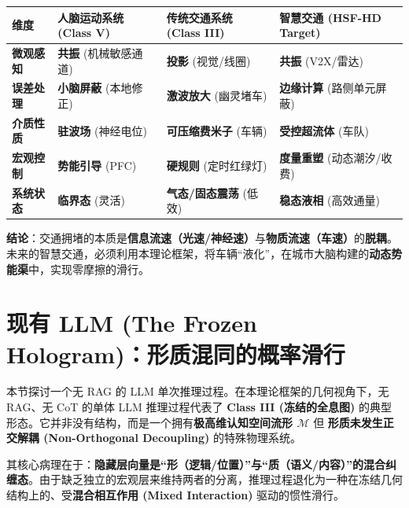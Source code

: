 
\begin{table}[htbp]
\centering
\begin{tabularx}{\textwidth}{l X X X}
\toprule
\rowcolor{structurecolor!20} 维度 & \textbf{人脑运动系统 (Class V)} & \textbf{传统交通系统 (Class III)} & \textbf{智慧交通 (HSF-HD Target)} \\
\midrule
\textbf{微观感知} & \textbf{共振} (机械敏感通道) & \textbf{投影} (视觉/线圈) & \textbf{共振} (V2X/雷达) \\
\textbf{误差处理} & \textbf{小脑屏蔽} (本地修正) & \textbf{激波放大} (幽灵堵车) & \textbf{边缘计算} (路侧单元屏蔽) \\
\textbf{介质性质} & \textbf{驻波场} (神经电位) & \textbf{可压缩费米子} (车辆) & \textbf{受控超流体} (车队) \\
\textbf{宏观控制} & \textbf{势能引导} (PFC) & \textbf{硬规则} (定时红绿灯) & \textbf{度量重塑} (动态潮汐/收费) \\
\textbf{系统状态} & \textbf{临界态} (灵活) & \textbf{气态/固态震荡} (低效) & \textbf{稳态液相} (高效通量) \\
\bottomrule
\end{tabularx}
\end{table}

\textbf{结论}：交通拥堵的本质是\textbf{信息流速（光速/神经速）}与\textbf{物质流速（车速）}的\textbf{脱耦}。未来的智慧交通，必须利用本理论框架，将车辆“液化”，在城市大脑构建的\textbf{动态势能渠}中，实现零摩擦的滑行。

\section{现有 LLM (The Frozen Hologram)：形质混同的概率滑行}
\label{sec:section_4389}

本节探讨一个无 RAG 的 LLM 单次推理过程。在本理论框架的几何视角下，无 RAG、无 CoT 的单体 LLM 推理过程代表了 \textbf{Class III (冻结的全息图)} 的典型形态。它并非没有结构，而是一个拥有\textbf{极高维认知空间流形 $\mathcal{M}$} 但 \textbf{形质未发生正交解耦 (Non-Orthogonal Decoupling)} 的特殊物理系统。

其核心病理在于：\textbf{隐藏层向量是“形（逻辑/位置）”与“质（语义/内容）”的混合纠缠态}。由于缺乏独立的宏观层来维持两者的分离，推理过程退化为一种在冻结几何结构上的、受\textbf{混合相互作用 (Mixed Interaction)} 驱动的惯性滑行。






